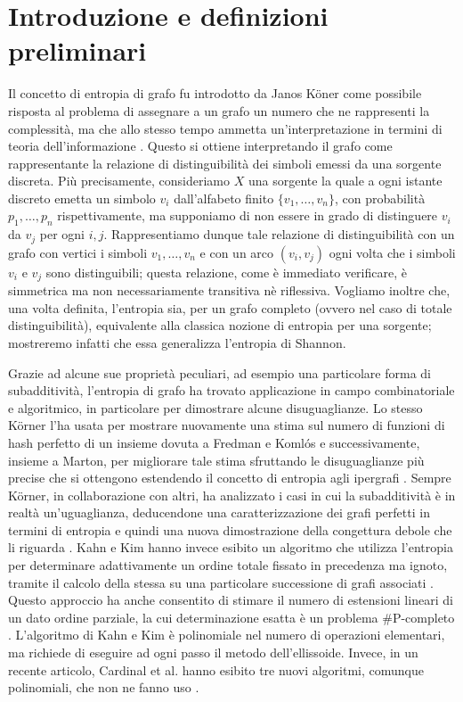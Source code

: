 \chapter{Introduzione e definizioni preliminari} 
Il concetto di entropia di grafo fu introdotto da Janos K\"oner come possibile risposta al problema di assegnare a un grafo un numero che ne rappresenti la complessità, ma che allo stesso tempo ammetta un'interpretazione in termini di teoria dell'informazione \cite{Korner1973}. Questo si ottiene interpretando il grafo come rappresentante la relazione di distinguibilità dei simboli emessi da una sorgente discreta. Più precisamente, consideriamo $X$ una sorgente la quale a ogni istante discreto emetta un simbolo $v_i$ dall'alfabeto finito $\{v_1,\dots,v_n\}$, con probabilità $p_1,\dots,p_n$ rispettivamente, ma supponiamo di non essere in grado di distinguere $v_i$ da $v_j$ per ogni $i,j$. Rappresentiamo dunque tale relazione di distinguibilità con un grafo con vertici i simboli $v_1,\dots,v_n$ e con un arco $(v_i,v_j)$ ogni volta che i simboli $v_i$ e $v_j$ sono distinguibili; questa relazione, come è immediato verificare, è simmetrica ma non necessariamente transitiva nè riflessiva. Vogliamo inoltre che, una volta definita, l'entropia sia, per un grafo completo (ovvero nel caso di totale distinguibilità), equivalente alla classica nozione di entropia per una sorgente; mostreremo infatti che essa generalizza l'entropia di Shannon.

Grazie ad alcune sue proprietà peculiari, ad esempio una particolare forma di subadditività, l'entropia di grafo ha trovato applicazione in campo combinatoriale e algoritmico, in particolare per dimostrare alcune disuguaglianze. Lo stesso K\"orner l'ha usata per mostrare nuovamente una stima sul numero di funzioni di hash perfetto di un insieme dovuta a Fredman e Koml\'os \cite{Korner1986} e successivamente, insieme a Marton, per migliorare tale stima sfruttando le disuguaglianze più precise che si ottengono estendendo il concetto di entropia agli ipergrafi \cite{Korner1990}. Sempre K\"orner, in collaborazione con altri, ha analizzato i casi in cui la subadditività è in realtà un'uguaglianza, deducendone una caratterizzazione dei grafi perfetti in termini di entropia e quindi una nuova dimostrazione della congettura debole che li riguarda \cite{Csiszar1990}. Kahn e Kim hanno invece esibito un algoritmo che utilizza l'entropia per determinare adattivamente un ordine totale fissato in precedenza ma ignoto, tramite il calcolo della stessa su una particolare successione di grafi associati \cite{Kahn1995}. Questo approccio ha anche consentito di stimare il numero di estensioni lineari di un dato ordine parziale, la cui determinazione esatta è un problema \#P-completo \cite{Brightwell1991}. L'algoritmo di Kahn e Kim \`e polinomiale nel numero di operazioni elementari, ma richiede di eseguire ad ogni passo il metodo dell'ellissoide. Invece, in un recente articolo, Cardinal et al. hanno esibito tre nuovi algoritmi, comunque polinomiali, che non ne fanno uso \cite{Cardinal2010}.

